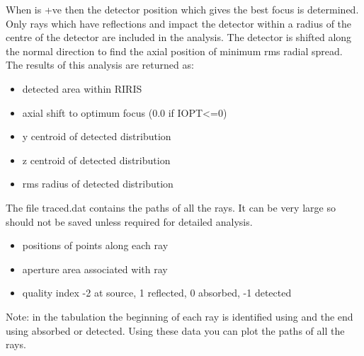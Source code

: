 \documentclass[letterpaper,10pt,english]{sphinxmanual}
\begin{document}
When  is +ve then the detector position which gives the best focus is
determined. Only rays which have  reflections and impact the detector
within a radius  of the centre of the detector are included in the
analysis. The detector is shifted along the normal direction to find
the axial position of minimum rms radial spread. The results of this
analysis are returned as:
\begin{itemize}
\item {} 
    detected area within RIRIS

\item {} 
   axial shift to optimum focus (0.0 if IOPT\textless{}=0)

\item {} 
    y centroid of detected distribution

\item {} 
    z centroid of detected distribution

\item {} 
     rms radius of detected distribution

\end{itemize}

The file traced.dat contains the paths of all the rays. It can be very large
so should not be saved unless required for detailed analysis.
\begin{itemize}
\item {} 
  positions of points along each ray

\item {} 
 aperture area associated with ray

\item {} 
  quality index -2 at source, 1 reflected, 0 absorbed, -1 detected

\end{itemize}

Note: in the tabulation the beginning of each ray is identified using 
and the end using  absorbed or  detected. Using these data
you can plot the paths of all the rays.
\end{document}
